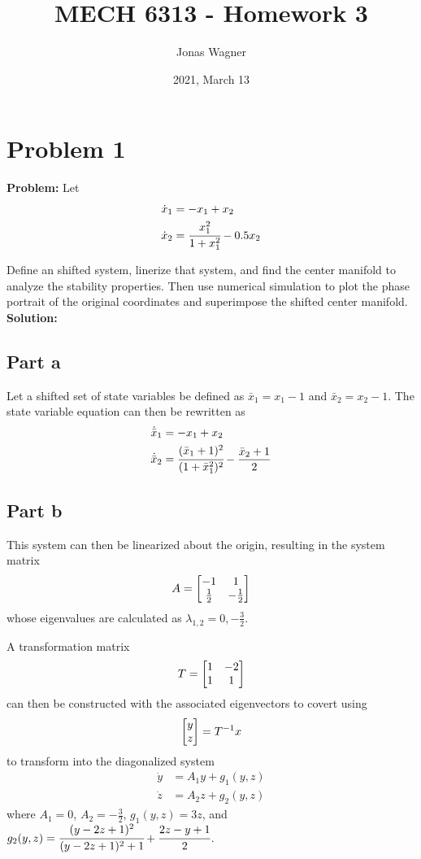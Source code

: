 \documentclass[letter]{article}
\title{MECH 6313 - Homework 3}
\author{Jonas Wagner}
\date{2021, March 13}
\begin{document}
\maketitle


\section{Problem 1}
\textbf{Problem:}
Let
\begin{equation}
	\begin{aligned}
		\dot{x}_1 &= -x_1 + x_2\\
		\dot{x}_2 &= \cfrac{x_1^2}{1 + x_1^2} - 0.5 x_2
	\end{aligned}
\end{equation}

Define an shifted system, linerize that system, and find the center manifold to analyze the stability properties. Then use numerical simulation to plot the phase portrait of the original coordinates and superimpose the shifted center manifold.\\

\textbf{Solution:}
\subsection{Part a}
Let a shifted set of state variables be defined as $\bar{x}_1 = x_1 - 1$ and $\bar{x}_2 = x_2 - 1$. The state variable equation can then be rewritten as
\begin{equation}
	\begin{aligned}
		\dot{\bar{x}}_1 &= -x_1 + x_2\\
		\dot{\bar{x}}_2 &= \cfrac{(\bar{x}_1+1)^2}{(1 + \bar{x}_1^2)^2} - \frac{\bar{x}_2 + 1}{2}
	\end{aligned}
\end{equation}

\subsection{Part b}
This system can then be linearized about the origin, resulting in the system matrix
\begin{equation}
	A = \mqty[-1 & 1\\ \frac{1}{2} & -\frac{1}{2}]
\end{equation}
whose eigenvalues are calculated as $\lambda_{1,2} = 0, -\frac{3}{2}$.

A transformation matrix $$T = \mqty[1&-2\\1&1]$$ can then be constructed with the associated eigenvectors to covert using $$\mqty[y\\z] = T^{-1} x$$ to transform into the diagonalized system
\begin{equation}
	\begin{aligned}
		\dot{y} &= A_1 y + g_1(y,z)\\
		\dot{z} &= A_2 z + g_2(y,z)
	\end{aligned}
\end{equation}
where $A_1 = 0$, $A_2 = -\frac{3}{2}$, $g_1(y,z) = 3z$, and $g_2(y,z) = \cfrac{(y-2z +1)^2}{(y-2z+1)^2+1} + \cfrac{2z - y + 1}{2}$.\\
\end{document}

